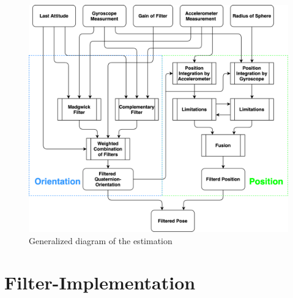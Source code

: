 \documentclass[letterpaper, 10 pt, conference]{ieeeconf}  %
\begin{document}
\begin{figure}[thpb]
\includegraphics[width=\linewidth]{./graphics/imuJasperChartSimliefiedBIG.png}
\caption{Generalized diagram of the estimation}
\label{generalized}
\end{figure}

\section{Filter-Implementation}
\end{document}
